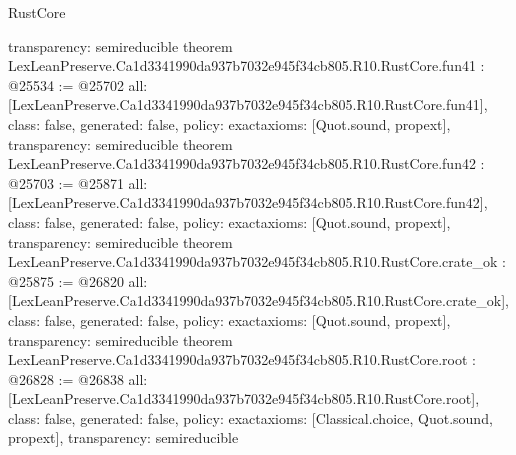 \begin{lexlean}{RustCore}
\begin{coremodule}
{  transparency: semireducible
}
theorem LexLeanPreserve.Ca1d3341990da937b7032e945f34cb805.R10.RustCore.fun41 : @25534 := @25702 {
  all: [LexLeanPreserve.Ca1d3341990da937b7032e945f34cb805.R10.RustCore.fun41],
  class: false,
  generated: false,
  policy: exact{axioms: [Quot.sound, propext]},
  transparency: semireducible
}
theorem LexLeanPreserve.Ca1d3341990da937b7032e945f34cb805.R10.RustCore.fun42 : @25703 := @25871 {
  all: [LexLeanPreserve.Ca1d3341990da937b7032e945f34cb805.R10.RustCore.fun42],
  class: false,
  generated: false,
  policy: exact{axioms: [Quot.sound, propext]},
  transparency: semireducible
}
theorem LexLeanPreserve.Ca1d3341990da937b7032e945f34cb805.R10.RustCore.crate_ok : @25875 := @26820 {
  all: [LexLeanPreserve.Ca1d3341990da937b7032e945f34cb805.R10.RustCore.crate_ok],
  class: false,
  generated: false,
  policy: exact{axioms: [Quot.sound, propext]},
  transparency: semireducible
}
theorem LexLeanPreserve.Ca1d3341990da937b7032e945f34cb805.R10.RustCore.root : @26828 := @26838 {
  all: [LexLeanPreserve.Ca1d3341990da937b7032e945f34cb805.R10.RustCore.root],
  class: false,
  generated: false,
  policy: exact{axioms: [Classical.choice, Quot.sound, propext]},
  transparency: semireducible
}


\end{coremodule}
\end{lexlean}
